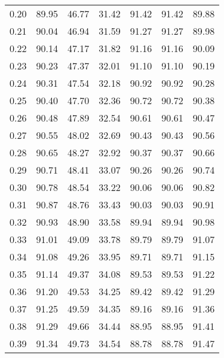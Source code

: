 \begin{tabular}{|c|c|c|c|c|c|c|}
      0.20 &     89.95 &     46.77 &      31.42 &   91.42 &      91.42 &         89.88 \\
      0.21 &     90.04 &     46.94 &      31.59 &   91.27 &      91.27 &         89.98 \\
      0.22 &     90.14 &     47.17 &      31.82 &   91.16 &      91.16 &         90.09 \\
      0.23 &     90.23 &     47.37 &      32.01 &   91.10 &      91.10 &         90.19 \\
      0.24 &     90.31 &     47.54 &      32.18 &   90.92 &      90.92 &         90.28 \\
      0.25 &     90.40 &     47.70 &      32.36 &   90.72 &      90.72 &         90.38 \\
      0.26 &     90.48 &     47.89 &      32.54 &   90.61 &      90.61 &         90.47 \\
      0.27 &     90.55 &     48.02 &      32.69 &   90.43 &      90.43 &         90.56 \\
      0.28 &     90.65 &     48.27 &      32.92 &   90.37 &      90.37 &         90.66 \\
      0.29 &     90.71 &     48.41 &      33.07 &   90.26 &      90.26 &         90.74 \\
      0.30 &     90.78 &     48.54 &      33.22 &   90.06 &      90.06 &         90.82 \\
      0.31 &     90.87 &     48.76 &      33.43 &   90.03 &      90.03 &         90.91 \\
      0.32 &     90.93 &     48.90 &      33.58 &   89.94 &      89.94 &         90.98 \\
      0.33 &     91.01 &     49.09 &      33.78 &   89.79 &      89.79 &         91.07 \\
      0.34 &     91.08 &     49.26 &      33.95 &   89.71 &      89.71 &         91.15 \\
      0.35 &     91.14 &     49.37 &      34.08 &   89.53 &      89.53 &         91.22 \\
      0.36 &     91.20 &     49.53 &      34.25 &   89.42 &      89.42 &         91.29 \\
      0.37 &     91.25 &     49.59 &      34.35 &   89.16 &      89.16 &         91.36 \\
      0.38 &     91.29 &     49.66 &      34.44 &   88.95 &      88.95 &         91.41 \\
      0.39 &     91.34 &     49.73 &      34.54 &   88.78 &      88.78 &         91.47 \\

\end{tabular}
